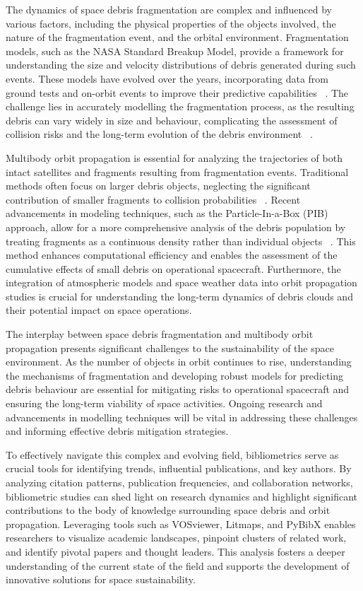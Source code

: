 \documentclass[journal ]{new-aiaa}
\begin{document}
The dynamics of space debris fragmentation are complex and influenced by various factors, including the physical properties of the objects involved, the nature of the fragmentation event, and the orbital environment. Fragmentation models, such as the NASA Standard Breakup Model, provide a framework for understanding the size and velocity distributions of debris generated during such events. These models have evolved over the years, incorporating data from ground tests and on-orbit events to improve their predictive capabilities ~\cite{johnson_nasas_2001}. The challenge lies in accurately modelling the fragmentation process, as the resulting debris can vary widely in size and behaviour, complicating the assessment of collision risks and the long-term evolution of the debris environment ~\cite{mains_impact_2021}.

Multibody orbit propagation is essential for analyzing the trajectories of both intact satellites and fragments resulting from fragmentation events. Traditional methods often focus on larger debris objects, neglecting the significant contribution of smaller fragments to collision probabilities ~\cite{letizia_collision_2016}. Recent advancements in modeling techniques, such as the Particle-In-a-Box (PIB) approach, allow for a more comprehensive analysis of the debris population by treating fragments as a continuous density rather than individual objects ~\cite{giudici_density-based_2024}. This method enhances computational efficiency and enables the assessment of the cumulative effects of small debris on operational spacecraft. Furthermore, the integration of atmospheric models and space weather data into orbit propagation studies is crucial for understanding the long-term dynamics of debris clouds and their potential impact on space operations.

The interplay between space debris fragmentation and multibody orbit propagation presents significant challenges to the sustainability of the space environment. As the number of objects in orbit continues to rise, understanding the mechanisms of fragmentation and developing robust models for predicting debris behaviour are essential for mitigating risks to operational spacecraft and ensuring the long-term viability of space activities. Ongoing research and advancements in modelling techniques will be vital in addressing these challenges and informing effective debris mitigation strategies.

To effectively navigate this complex and evolving field, bibliometrics serve as crucial tools for identifying trends, influential publications, and key authors. By analyzing citation patterns, publication frequencies, and collaboration networks, bibliometric studies can shed light on research dynamics and highlight significant contributions to the body of knowledge surrounding space debris and orbit propagation. Leveraging tools such as VOSviewer, Litmaps, and PyBibX enables researchers to visualize academic landscapes, pinpoint clusters of related work, and identify pivotal papers and thought leaders. This analysis fosters a deeper understanding of the current state of the field and supports the development of innovative solutions for space sustainability.
\end{document}
